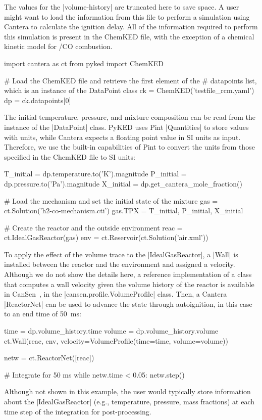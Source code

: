 \documentclass[12pt]{ijck}
\newcommand\ck{ChemKED}
\newcommand\pk{PyKED}
\begin{document}
%
The values for the \yabox|volume-history| are truncated here to save space. A user
might want to load the information from this file to perform a simulation using
Cantera to calculate the ignition delay. All of the information required to
perform this simulation is present in the \ck{} file, with the exception of a
chemical kinetic model for \slash {CO} combustion.
%
\begin{pythonbox}
import cantera as ct
from pyked import ChemKED

# Load the ChemKED file and retrieve the first element of the
# datapoints list, which is an instance of the DataPoint class
ck = ChemKED('testfile_rcm.yaml')
dp = ck.datapoints[0]
\end{pythonbox}
%
The initial temperature, pressure, and mixture composition can be read from the
instance of the \pybox|DataPoint| class. \pk{} uses Pint \pybox|Quantities| to
store values with units, while Cantera expects a floating point value in SI
units as input. Therefore, we use the built-in capabilities of Pint to convert
the units from those specified in the \ck{} file to SI units:
%
\begin{pythonbox}
T_initial = dp.temperature.to('K').magnitude
P_initial = dp.pressure.to('Pa').magnitude
X_initial = dp.get_cantera_mole_fraction()

# Load the mechanism and set the initial state of the mixture
gas = ct.Solution('h2-co-mechanism.cti')
gas.TPX = T_initial, P_initial, X_initial

# Create the reactor and the outside environment
reac = ct.IdealGasReactor(gas)
env = ct.Reservoir(ct.Solution('air.xml'))
\end{pythonbox}
%
To apply the effect of the volume trace to the \pybox|IdealGasReactor|, a
\pybox|Wall| is installed between the reactor and the environment and assigned
a velocity. Although we do not show the details here, a reference implementation
of a class that computes a wall velocity given the volume history of the reactor
is available in CanSen~\autocite{cansen}, in the
\pybox|cansen.profile.VolumeProfile| class. Then, a Cantera \pybox|ReactorNet|
can be used to advance the state through autoignition, in this case to an end
time of \SI{50}{\milli\second}:
%
\begin{pythonbox}
time = dp.volume_history.time
volume = dp.volume_history.volume
ct.Wall(reac, env, velocity=VolumeProfile(time=time, volume=volume))

netw = ct.ReactorNet([reac])

# Integrate for 50 ms
while netw.time < 0.05:
    netw.step()
\end{pythonbox}
%
Although not shown in this example, the user would typically store information
about the \pybox|IdealGasReactor| (e.g., temperature, pressure, mass fractions)
at each time step of the integration for post-processing.
\end{document}
